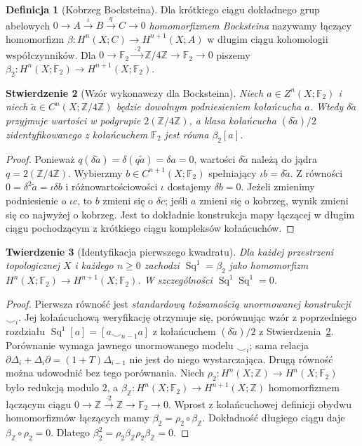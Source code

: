 \documentclass[11pt,a4paper,oneside]{report}
\newcommand{\F}{\mathbb{F}}
\newcommand{\Z}{\mathbb{Z}}
\theoremstyle{plain}
\newtheorem{twierdzenie}{Twierdzenie}[section]
\newtheorem{stwierdzenie}[twierdzenie]{Stwierdzenie}
\theoremstyle{definition}
\newtheorem{definicja}[twierdzenie]{Definicja}
\theoremstyle{remark}
\begin{document}
\begin{definicja}[Kobrzeg Bocksteina]
Dla krótkiego ciągu dokładnego grup abelowych
$0\to A\xrightarrow{\iota}B\xrightarrow{q}C\to0$
\emph{homomorfizmem Bocksteina} nazywamy łączący homomorfizm
$\beta:H^n(X;C)\to H^{n+1}(X;A)$
w długim ciągu kohomologii współczynników.
Dla $0\to\F_2\xrightarrow{\,\cdot2\,}\Z/4\Z\to\F_2\to0$
piszemy $\beta_2:H^n(X;\F_2)\to H^{n+1}(X;\F_2)$.
\end{definicja}

\begin{stwierdzenie}[Wzór wykonawczy dla Bocksteina]
\label{prop:bockstein-v8}
Niech $a\in Z^n(X;\F_2)$ i niech $\widetilde a\in C^n(X;\Z/4\Z)$
będzie dowolnym podniesieniem kołańcucha $a$. Wtedy
$\delta\widetilde a$ przyjmuje wartości w podgrupie
$2(\Z/4\Z)$, a klasa kołańcucha
$(\delta\widetilde a)/2$ zidentyfikowanego z kołańcuchem
$\F_2$ jest równa $\beta_2[a]$.
\end{stwierdzenie}
\begin{proof}
Ponieważ $q(\delta\widetilde a)=\delta(q\widetilde a)=\delta a=0$,
wartości $\delta\widetilde a$ należą do jądra $q=2(\Z/4\Z)$.
Wybierzmy $b\in C^{n+1}(X;\F_2)$ spełniający
$\iota b=\delta\widetilde a$. Z równości
$0=\delta^2\widetilde a=\iota\delta b$ i różnowartościowości
$\iota$ dostajemy $\delta b=0$.
Jeżeli zmienimy podniesienie o $\iota c$, to $b$ zmieni się
o $\delta c$; jeśli $a$ zmieni się o kobrzeg, wynik zmieni się
co najwyżej o kobrzeg. Jest to dokładnie konstrukcja mapy łączącej
w długim ciągu pochodzącym z krótkiego ciągu kompleksów kołańcuchów.
\end{proof}

\begin{twierdzenie}[Identyfikacja pierwszego kwadratu]
\label{thm:sq1-bock-v8}
Dla każdej przestrzeni topologicznej $X$ i każdego $n\ge0$
zachodzi $\operatorname{Sq}^1=\beta_2$ jako homomorfizm
$H^n(X;\F_2)\to H^{n+1}(X;\F_2)$.
W szczególności $\operatorname{Sq}^1\operatorname{Sq}^1=0$.
\end{twierdzenie}
\begin{proof}
Pierwsza równość jest \emph{standardową tożsamością unormowanej
konstrukcji $\smile_i$}. Jej kołańcuchową weryfikację otrzymuje się,
porównując wzór z poprzedniego rozdziału
$\operatorname{Sq}^1[a]=[a\smile_{n-1}a]$
z kołańcuchem $(\delta\widetilde a)/2$ z
Stwierdzenia~\ref{prop:bockstein-v8}. Porównanie wymaga jawnego
unormowanego modelu $\smile_i$; sama relacja
$\partial\Delta_i+\Delta_i\partial=(1+T)\Delta_{i-1}$
nie jest do niego wystarczająca. Drugą równość można udowodnić bez tego porównania.
Niech $\rho_2:H^n(X;\Z)\to H^n(X;\F_2)$
było redukcją modulo $2$, a
$\beta_{\Z}:H^n(X;\F_2)\to H^{n+1}(X;\Z)$
homomorfizmem łączącym ciągu
$0\to\Z\xrightarrow{\cdot2}\Z\to\F_2\to0$.
Wprost z kołańcuchowej definicji obydwu homomorfizmów
łączących mamy $\beta_2=\rho_2\circ\beta_{\Z}$.
Dokładność długiego ciągu daje
$\beta_{\Z}\circ\rho_2=0$. Dlatego
$\beta_2^2=\rho_2\beta_{\Z}\rho_2\beta_{\Z}=0$.
\end{proof}
\end{document}
